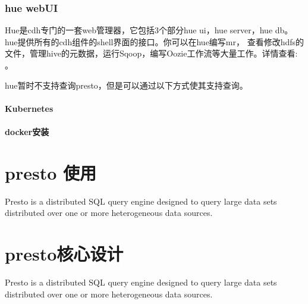 \documentclass[letterpaper,10pt,english]{sphinxmanual}
\begin{document}
\noindent{}


\subsection{hue webUI}
\label{\detokenize{installation/webui:hue-webui}}
Hue是cdh专门的一套web管理器，它包括3个部分hue ui，hue server，hue db。hue提供所有的cdh组件的shell界面的接口。你可以在hue编写mr，
查看修改hdfs的文件，管理hive的元数据，运行Sqoop，编写Oozie工作流等大量工作。详情查看: 。

hue暂时不支持查询presto，但是可以通过以下方式使其支持查询。


\subsubsection{Kubernetes}
\label{\detokenize{installation/webui:kubernetes}}
\begin{sphinxVerbatim}[commandchars=\\\{\}]
    
  
  
\end{sphinxVerbatim}


\subsubsection{docker安装}
\label{\detokenize{installation/webui:docker}}
\begin{sphinxVerbatim}[commandchars=\\\{\}]
     
\end{sphinxVerbatim}


\chapter{presto 使用}
\label{\detokenize{usercase:presto}}\label{\detokenize{usercase::doc}}
Presto is a distributed SQL query engine designed to query large data sets distributed over one or more heterogeneous data sources.


\chapter{presto核心设计}
\label{\detokenize{core:presto}}\label{\detokenize{core::doc}}
Presto is a distributed SQL query engine designed to query large data sets distributed over one or more heterogeneous data sources.
\end{document}

